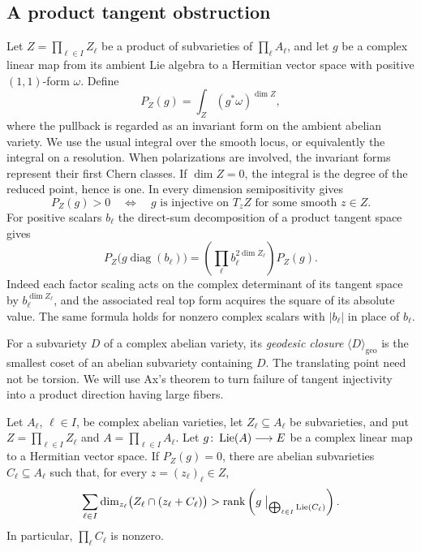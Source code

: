 \subsection{A product tangent obstruction}

Let $Z=\prod_{\ell\in I}Z_\ell$ be a product of subvarieties of
$\prod_\ell A_\ell$, and let $g$ be a complex linear map from its
ambient Lie algebra to a Hermitian vector space with positive
$(1,1)$-form $\omega$. Define
\begin{equation}
 \label{eq:tangent-integral}
 P_Z(g)=\int_Z(g^*\omega)^{\dim Z},
\end{equation}
where the pullback is regarded as an invariant form on the ambient
abelian variety. We use the usual integral over the smooth locus,
or equivalently the integral on a resolution. When polarizations
are involved, the invariant forms represent their first Chern
classes. If $\dim Z=0$, the integral is the degree of the reduced
point, hence is one. In every dimension semipositivity gives
\[
 P_Z(g)>0\quad\Longleftrightarrow\quad
 g\text{ is injective on }T_zZ
 \text{ for some smooth }z\in Z.
\]
For positive scalars $b_\ell$ the direct-sum decomposition of a
product tangent space gives
\begin{equation}
 \label{eq:product-scaling}
 P_Z\bigl(g\operatorname{diag}(b_\ell)\bigr)
 =\left(\prod_\ell b_\ell^{2\dim Z_\ell}\right)P_Z(g).
\end{equation}
Indeed each factor scaling acts on the complex determinant of its
tangent space by $b_\ell^{\dim Z_\ell}$, and the associated real
top form acquires the square of its absolute value. The same formula
holds for nonzero complex scalars with $|b_\ell|$ in place of
$b_\ell$.

For a subvariety $D$ of a complex abelian variety, its
\emph{geodesic closure} $\langle D\rangle_{\mathrm{geo}}$ is the
smallest coset of an abelian subvariety containing $D$. The translating
point need not be torsion. We will use Ax's theorem to turn failure of
tangent injectivity into a product direction having large fibers.

\begin{lemma}\label{lem:ax-product}
Let $A_\ell$, $\ell\in I$, be complex abelian varieties, let
$Z_\ell\subseteq A_\ell$ be subvarieties, and put
$Z=\prod_{\ell\in I}Z_\ell$ and $A=\prod_{\ell\in I}A_\ell$.
Let $g\colon\operatorname{Lie}(A)\longrightarrow E$ be a complex linear map to a
Hermitian vector space. If $P_Z(g)=0$, there are abelian subvarieties
$C_\ell\subseteq A_\ell$ such that, for every
$z=(z_\ell)_\ell\in Z$,
\begin{equation}\label{eq:ax-product-obstruction}
 \sum_{\ell\in I}
 \dim_{z_\ell}\bigl(Z_\ell\cap(z_\ell+C_\ell)\bigr)
 >\operatorname{rank}\left(g\bigm|_{\bigoplus_{\ell\in I}\operatorname{Lie}(C_\ell)}\right).
\end{equation}
In particular, $\prod_\ell C_\ell$ is nonzero.
\end{lemma}

